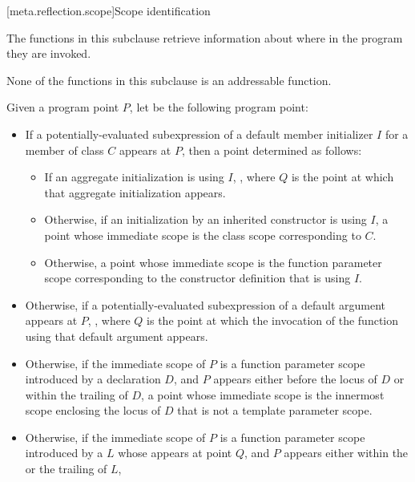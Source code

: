 [meta.reflection.scope]{Scope identification}

\pnum
The functions in this subclause retrieve information
about where in the program they are invoked.

\pnum
None of the functions in this subclause
is an addressable function.

\pnum
Given a program point $P$,
let  be the following program point:
\begin{itemize}
\item
  If a potentially-evaluated subexpression
  of a default member initializer $I$
  for a member of class $C$
  appears at $P$,
  then a point determined as follows:
  \begin{itemize}
  \item
    If an aggregate initialization is using $I$,
    ,
    where $Q$ is the point at which that aggregate initialization appears.
  \item
    Otherwise, if an initialization
    by an inherited constructor is using $I$,
    a point whose immediate scope is the class scope corresponding to $C$.
  \item
    Otherwise, a point whose immediate scope
    is the function parameter scope
    corresponding to the constructor definition that is using $I$.
  \end{itemize}
  \item
    Otherwise, if a potentially-evaluated subexpression
    of a default argument appears at $P$,
    ,
    where $Q$ is the point at which the invocation of the function
    using that default argument appears.
  \item
    Otherwise, if the immediate scope of $P$
    is a function parameter scope introduced by a declaration $D$,
    and $P$ appears either before the locus of $D$
    or within the trailing  of $D$,
    a point whose immediate scope is the innermost scope enclosing the locus of $D$
    that is not a template parameter scope.
  \item
    Otherwise, if the immediate scope of $P$
    is a function parameter scope
    introduced by a  $L$
    whose  appears at point $Q$,
    and $P$ appears either within the 
    or the trailing  of $L$,

\end{itemize}

